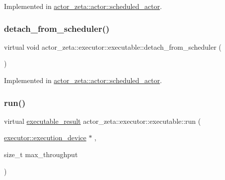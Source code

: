 Implemented in \hyperlink{classactor__zeta_1_1actor_1_1scheduled__actor_a760f7fedcd61cae392c435a13bcab50c}{actor\+\_\+zeta\+::actor\+::scheduled\+\_\+actor}.

\mbox{\label{structactor__zeta_1_1executor_1_1executable_a2fe91b45b919fc6f3fce21e64d2c1f91}} 
\subsubsection{\texorpdfstring{detach\+\_\+from\+\_\+scheduler()}{detach\_from\_scheduler()}}
{\footnotesize\ttfamily virtual void actor\+\_\+zeta\+::executor\+::executable\+::detach\+\_\+from\+\_\+scheduler (\begin{DoxyParamCaption}{ }\end{DoxyParamCaption})\hspace{0.3cm}{\ttfamily [pure virtual]}}



Implemented in \hyperlink{classactor__zeta_1_1actor_1_1scheduled__actor_aaf6582fc27718071ff7c9d516b8f0cf6}{actor\+\_\+zeta\+::actor\+::scheduled\+\_\+actor}.

\mbox{\label{structactor__zeta_1_1executor_1_1executable_a61d6cbce8b124e1e5ef80f8befea2a89}} 
\subsubsection{\texorpdfstring{run()}{run()}}
{\footnotesize\ttfamily virtual \hyperlink{structactor__zeta_1_1executor_1_1executable_aef06c63be7b22b021ade4b83ed4f3cc4}{executable\+\_\+result} actor\+\_\+zeta\+::executor\+::executable\+::run (\begin{DoxyParamCaption}\item[{\hyperlink{structactor__zeta_1_1executor_1_1execution__device}{executor\+::execution\+\_\+device} $\ast$}]{,  }\item[{size\+\_\+t}]{max\+\_\+throughput }\end{DoxyParamCaption})\hspace{0.3cm}{\ttfamily [pure virtual]}}



